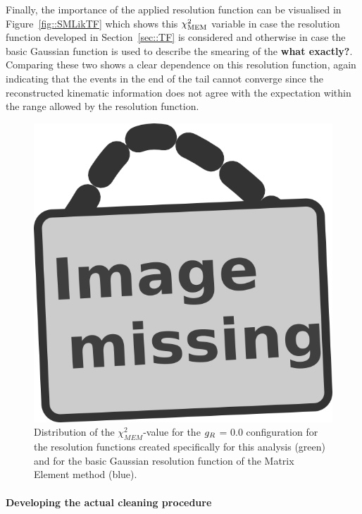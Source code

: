 Finally, the importance of the applied resolution function can be visualised in Figure~\ref{fig::SMLikTF} which shows this $\chi^{2}_{\textrm{MEM}}$ variable in case the resolution function developed in Section~\ref{sec::TF} is considered and otherwise in case the basic Gaussian function is used to describe the smearing of the \textbf{what exactly?}.
Comparing these two shows a clear dependence on this resolution function, again indicating that the events in the end of the tail cannot converge since the reconstructed kinematic information does not agree with the expectation within the range allowed by the resolution function.
\begin{figure}[h!t]
 \centering
 \includegraphics[width = 0.35 \textwidth]{image.png} %
 \caption{Distribution of the $\chi^{2}_{MEM}$-value for the $g_{R}$ = $0.0$ configuration for the resolution functions created specifically for this analysis (green) and for the basic Gaussian resolution function of the Matrix Element method (blue).} \label{Fig::SMLikTF}
\end{figure}

\paragraph{Developing the actual cleaning procedure} \hfill \\


